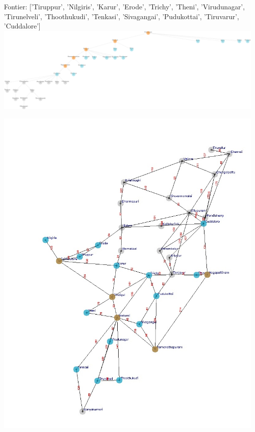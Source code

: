 \documentclass[xcolor=table]{beamer}
\begin{document}
\begin{frame}
  { \tiny Fontier: ['Tiruppur', 'Nilgiris', 'Karur', 'Erode', 'Trichy', 'Theni', 'Virudunagar', 'Tirunelveli', 'Thoothukudi', 'Tenkasi', 'Sivagangai', 'Pudukottai', 'Tiruvarur', 'Cuddalore'] }
  \includegraphics[width=1\textwidth]{../DFSNodes/7-1.png}
  \begin{center}
    \includegraphics[height=0.45\textheight]{../DFSoutput/tamilDFS5.jpg}
  \end{center}
\end{frame}
\end{document}

